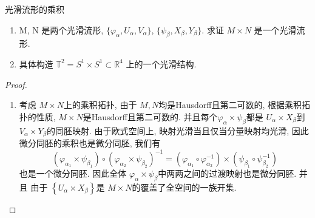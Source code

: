 \documentclass[../main.tex]{subfiles}
\begin{document}
\begin{exercise}{光滑流形的乘积}{}
\begin{enumerate}
\item M, N 是两个光滑流形, $\{\varphi_{\alpha}, U_{\alpha}, V_{\alpha}\}$, $\{\psi_{\beta}, X_{\beta}, Y_{\beta}\}$. 求证 $M \times N$ 是一个光滑流形.
\item 具体构造 $\mathbb{T}^2 = S^1 \times S^1 \subset \mathbb{R}^4$ 上的一个光滑结构.
\end{enumerate}
\end{exercise}
\begin{proof}
    \begin{enumerate}
        \item  考虑 \(  M\times N  \)上的乘积拓扑, 由于 \(  M,N  \)均是Hausdorff且第二可数的,  根据乘积拓扑的性质,  \(  M\times N  \)是Hausdorff且第二可数的.  并且每个\(   \varphi _{\alpha }\times \psi _{\beta }  \)都是  \(  U_{\alpha }\times X_{\beta }  \)到 \(  V_{\alpha }\times Y_{\beta }  \)的同胚映射. 由于欧式空间上, 映射光滑当且仅当分量映射均光滑, 因此微分同胚的乘积也是微分同胚, 我们有 \[
        \left(  \varphi _{ \alpha _1 }\times \psi _{\beta _1 } \right)\circ\left(  \varphi _{\alpha _2 }\times \psi _{\beta _2 } \right)^{-1} = \left(  \varphi _{ \alpha _1 }\circ  \varphi _{ \alpha _2 }^{-1}  \right)\times \left( \psi _{ \beta _1 }\circ\psi _{\beta _2 }^{-1}  \right)    
        \]也是一个微分同胚. 因此全体 \(   \varphi _{\alpha }\times \psi _{\beta }  \)中两两之间的过渡映射也是微分同胚. 并且 由于 \(  \left\{  U_{\alpha }\times X_{\beta }  \right\} \)是 \(  M\times N  \)的覆盖了全空间的一族开集.    
        

\end{enumerate}
\end{proof}
\end{document}

